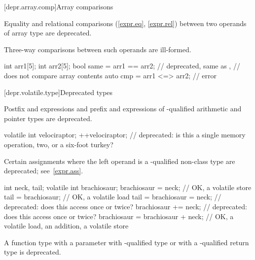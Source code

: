 [depr.array.comp]{Array comparisons}

\pnum
Equality and relational comparisons (\ref{expr.eq}, \ref{expr.rel})
between two operands of array type
are deprecated.
\begin{note}
Three-way comparisons between such operands are ill-formed.
\end{note}
\begin{example}
\begin{codeblock}
int arr1[5];
int arr2[5];
bool same = arr1 == arr2;       // deprecated, same as ,
                                // does not compare array contents
auto cmp = arr1 <=> arr2;       // error
\end{codeblock}
\end{example}

[depr.volatile.type]{Deprecated  types}

\pnum
Postfix \tcode{++} and \tcode{\dcr} expressions and
prefix \tcode{++} and \tcode{\dcr} expressions
of -qualified arithmetic and pointer types are deprecated.

\begin{example}
\begin{codeblock}
volatile int velociraptor;
++velociraptor;                 // deprecated: is this a single memory operation, two, or a six-foot turkey?
\end{codeblock}
\end{example}


\pnum
Certain assignments
where the left operand is a -qualified non-class type
are deprecated; see~\ref{expr.ass}.

\begin{example}
\begin{codeblock}
int neck, tail;
volatile int brachiosaur;
brachiosaur = neck;             // OK, a volatile store
tail = brachiosaur;             // OK, a volatile load
tail = brachiosaur = neck;      // deprecated: does this access  once or twice?
brachiosaur += neck;            // deprecated: does this access  once or twice?
brachiosaur = brachiosaur + neck;   // OK, a volatile load, an addition, a volatile store
\end{codeblock}
\end{example}


\pnum
A function type
with a parameter with -qualified type or
with a -qualified return type is deprecated.

